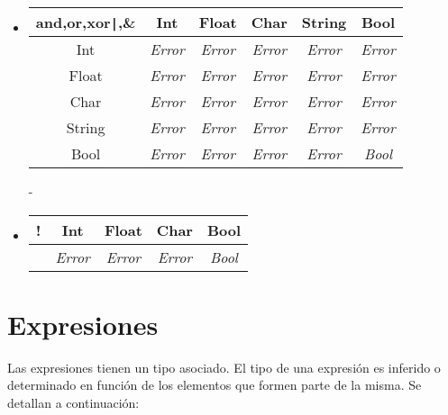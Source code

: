 \documentclass[12pt, spanish]{report}
\begin{document}
\begin{itemize}
\item
\begin{tabular}{|c||ccccc|}
	    \hline
and,or,xor\texttt{|},\& &  Int&    Float     &     Char     &     String   & Bool  \\
	    \hline \hline
Int         & \emph{Error} & \emph{Error} & \emph{Error} & \emph{Error} & \emph{Error} \\
Float       & \emph{Error} & \emph{Error} & \emph{Error} & \emph{Error} & \emph{Error} \\
Char        & \emph{Error} & \emph{Error} & \emph{Error} & \emph{Error} & \emph{Error} \\
String      & \emph{Error} & \emph{Error} & \emph{Error} & \emph{Error} & \emph{Error} \\
Bool        & \emph{Error} & \emph{Error} & \emph{Error} & \emph{Error} & \emph{Bool} \\
	\hline
\end{tabular}
-
\item
\begin{tabular}{|c||cccc|}
 \hline
!       &  Int  & Float & Char  & Bool  \\
 \hline \hline
        & \emph{Error} & \emph{Error} & \emph{Error} & \emph{Bool} \\
	\hline
\end{tabular}
\end{itemize}

\chapter{Expresiones}
\label{sec:expr}

Las expresiones tienen un tipo asociado. El tipo de una expresi\'on es
inferido o determinado en funci\'on de los elementos que formen parte
de la misma. Se detallan a continuaci\'on:
\end{document}

